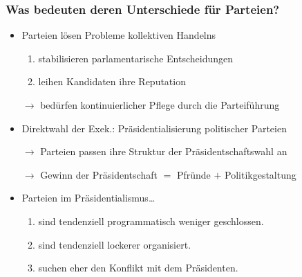 \documentclass{beamer}
\begin{document}
\begin{frame}
\frametitle{Was bedeuten deren Unterschiede für Parteien?}
\begin{itemize}
  \item Parteien lösen Probleme kollektiven Handelns
  \begin{enumerate}
    \item stabilisieren parlamentarische Entscheidungen
    \item leihen Kandidaten ihre Reputation
  \end{enumerate}
  \item [$\rightarrow$] bedürfen kontinuierlicher Pflege durch die Parteiführung
  \item Direktwahl der Exek.: Präsidentialisierung politischer Parteien
  \item [$\rightarrow$] Parteien passen ihre Struktur der Präsidentschaftswahl an
  \item [$\rightarrow$] Gewinn der Präsidentschaft $=$ Pfründe $+$ Politikgestaltung
  \item Parteien im Präsidentialismus\dots
  \begin{enumerate}
    \item sind tendenziell programmatisch weniger geschlossen.
    \item sind tendenziell lockerer organisiert.
    \item suchen eher den Konflikt mit dem Präsidenten.
  \end{enumerate}
\end{itemize}
\end{frame}
\end{document}
